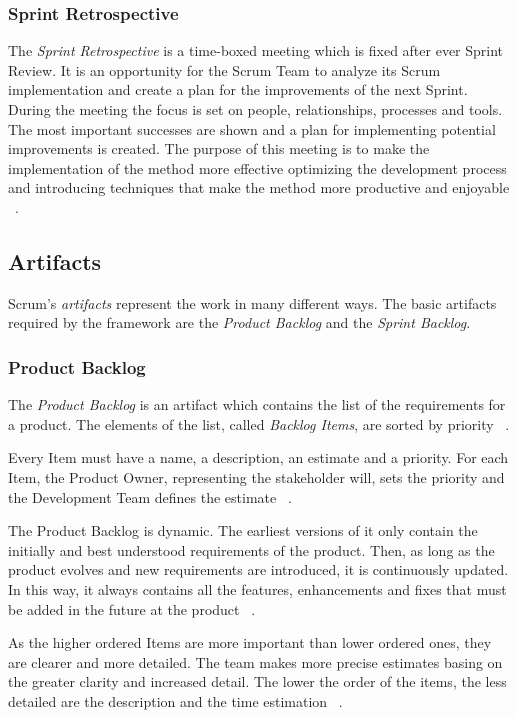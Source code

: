 			\subsubsection{Sprint Retrospective}\label{ref_scrum_sprint_retro}
			The \emph{Sprint Retrospective} is a time-boxed meeting which is fixed after ever Sprint Review. It is an opportunity for the Scrum Team to analyze its Scrum implementation and create a plan for the improvements of the next Sprint. 
			During the meeting the focus is set on people, relationships, processes and tools. The most important successes are shown and a plan for implementing potential improvements is created. 
			The purpose of this meeting is to make the implementation of the method more effective optimizing the development process and introducing techniques that make the method more productive and enjoyable ~\cite{scrumEnglishGuide}. 

		
		\subsection{Artifacts}\label{ref_scrum_artifacts}
			Scrum's \emph{artifacts} represent the work in many different ways. The basic artifacts required by the framework are the \emph{Product Backlog} and the \emph{Sprint Backlog}.

			\subsubsection{Product Backlog}\label{ref_scrum_prod_backlog}
			The \emph{Product Backlog} is an artifact which contains the list of the requirements for a product. The elements of the list, called \emph{Backlog Items}, are sorted by priority ~\cite{scrumEnglishGuide}.

			Every Item must have a name, a description, an estimate and a priority. For each Item, the Product Owner, representing the stakeholder will, sets the priority and	 the Development Team defines the estimate ~\cite{scrumEnglishGuide}.

			The Product Backlog is dynamic. The earliest versions of it only contain the initially and best understood requirements of the product. Then, as long as the product evolves and new requirements are introduced, it is continuously updated. In this way, it always contains all the features, enhancements and fixes that must be added in the future at the product ~\cite{scrumEnglishGuide}.  

			As the higher ordered Items are more important than lower ordered ones, they are clearer and more detailed. The team makes more precise estimates basing on the greater clarity and increased detail. The lower the order of the items, the less detailed are the description and the time estimation ~\cite{scrumEnglishGuide}.  
			
